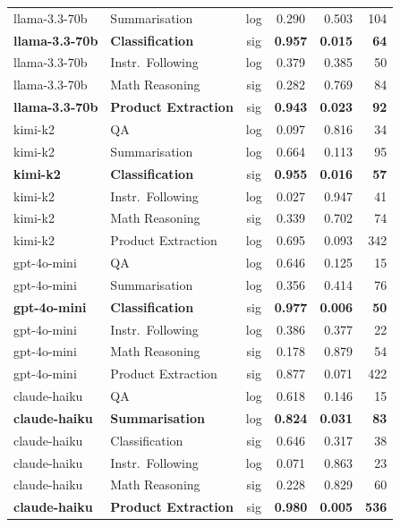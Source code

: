 \begin{table}[h]
\begin{tabular}{llccrr}
llama-3.3-70b & Summarisation      & log & 0.290 & 0.503 & 104 \\
\textbf{llama-3.3-70b} & \textbf{Classification}    & sig & \textbf{0.957} & \textbf{0.015} & \textbf{64}  \\
llama-3.3-70b & Instr.\ Following  & log & 0.379 & 0.385 & 50  \\
llama-3.3-70b & Math Reasoning     & sig & 0.282 & 0.769 & 84  \\
\textbf{llama-3.3-70b} & \textbf{Product Extraction} & sig & \textbf{0.943} & \textbf{0.023} & \textbf{92}  \\
\midrule
kimi-k2       & QA                 & log & 0.097 & 0.816 & 34  \\
kimi-k2       & Summarisation      & log & 0.664 & 0.113 & 95  \\
\textbf{kimi-k2}       & \textbf{Classification}    & sig & \textbf{0.955} & \textbf{0.016} & \textbf{57}  \\
kimi-k2       & Instr.\ Following  & log & 0.027 & 0.947 & 41  \\
kimi-k2       & Math Reasoning     & sig & 0.339 & 0.702 & 74  \\
kimi-k2       & Product Extraction & log & 0.695 & 0.093 & 342 \\
\midrule
gpt-4o-mini   & QA                 & log & 0.646 & 0.125 & 15  \\
gpt-4o-mini   & Summarisation      & log & 0.356 & 0.414 & 76  \\
\textbf{gpt-4o-mini}   & \textbf{Classification}    & sig & \textbf{0.977} & \textbf{0.006} & \textbf{50}  \\
gpt-4o-mini   & Instr.\ Following  & log & 0.386 & 0.377 & 22  \\
gpt-4o-mini   & Math Reasoning     & sig & 0.178 & 0.879 & 54  \\
gpt-4o-mini   & Product Extraction & sig & 0.877 & 0.071 & 422 \\
\midrule
claude-haiku  & QA                 & log & 0.618 & 0.146 & 15  \\
\textbf{claude-haiku}  & \textbf{Summarisation}     & log & \textbf{0.824} & \textbf{0.031} & \textbf{83}  \\
claude-haiku  & Classification     & sig & 0.646 & 0.317 & 38  \\
claude-haiku  & Instr.\ Following  & log & 0.071 & 0.863 & 23  \\
claude-haiku  & Math Reasoning     & sig & 0.228 & 0.829 & 60  \\
\textbf{claude-haiku}  & \textbf{Product Extraction} & sig & \textbf{0.980} & \textbf{0.005} & \textbf{536} \\
\bottomrule
\end{tabular}
\end{table}

